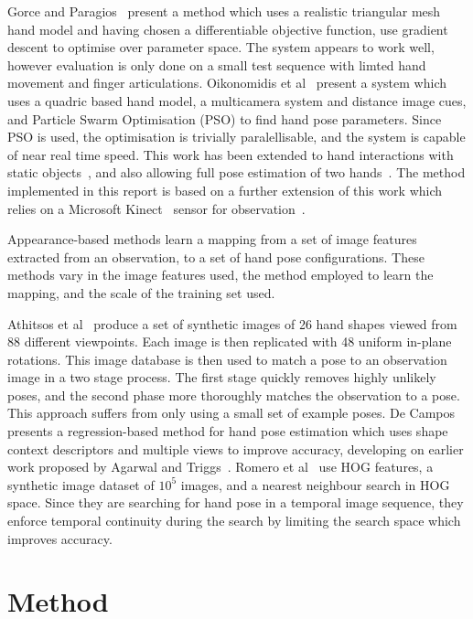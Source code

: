 \documentclass[10pt,a4paper,notitlepage,twocolumn]{report}
\begin{document}
Gorce and Paragios~\cite{de2008model} present a method which uses a realistic triangular mesh hand model and having chosen a differentiable objective function, use gradient descent to optimise over parameter space.  The system appears to work well, however evaluation is only done on a small test sequence with limted hand movement and finger articulations.  Oikonomidis et al~\cite{oikonomidis2011markerless} present a system which uses a quadric based hand model, a multicamera system and distance image cues, and Particle Swarm Optimisation (PSO) to find hand pose parameters.  Since PSO is used, the optimisation is trivially paralellisable, and the system is capable of near real time speed.  This work has been extended to hand interactions with static objects~\cite{oikonomidis2011}, and also allowing full pose estimation of two hands~\cite{oikonomidis2012}.  The method implemented in this report is based on a further extension of this work which relies on a Microsoft Kinect~\cite{kinect} sensor for observation~\cite{bmvc2011oikonom}.

Appearance-based methods learn a mapping from a set of image features extracted from an observation, to a set of hand pose configurations.  These methods vary in the image features used, the method employed to learn the mapping, and the scale of the training set used.  

Athitsos et al~\cite{athitsos2003estimating} produce a set of synthetic images of 26 hand shapes viewed from 88 different viewpoints.  Each image is then replicated with 48 uniform in-plane rotations.  This image database is then used to match a pose to an observation image in a two stage process.  The first stage quickly removes highly unlikely poses, and the second phase more thoroughly matches the observation to a pose.  This approach suffers from only using a small set of example poses.  De Campos~\cite{de2006regression} presents a regression-based method for hand pose estimation which uses shape context descriptors and multiple views to improve accuracy, developing on earlier work proposed by Agarwal and Triggs~\cite{agarwal2006recovering}.  Romero et al~\cite{romero2009monocular} use HOG features, a synthetic image dataset of $10^5$ images, and a nearest neighbour search in HOG space.  Since they are searching for hand pose in a temporal image sequence, they enforce temporal continuity during the search by limiting the search space which improves accuracy.

\section{Method}
\end{document}
